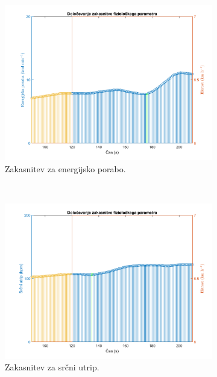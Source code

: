 \begin{figure}[htb]
\centering
\begin{subfigure}[t]{0.45\columnwidth}
\includegraphics[width=\columnwidth]{./Slike/lag-estimation-train-eem.png}
\caption{Zakasnitev za energijsko porabo.}
\label{fig:lag-estimation-train-eem}
\end{subfigure}
~
\begin{subfigure}[t]{0.45\columnwidth}
\includegraphics[width=\columnwidth]{./Slike/lag-estimation-train-hr.png}
\caption{Zakasnitev za srčni utrip.}
\label{fig:lag-estimation-train-hr}
\end{subfigure}
\caption{}
\label{fig:lag-estimation-stage1}
\end{figure}


